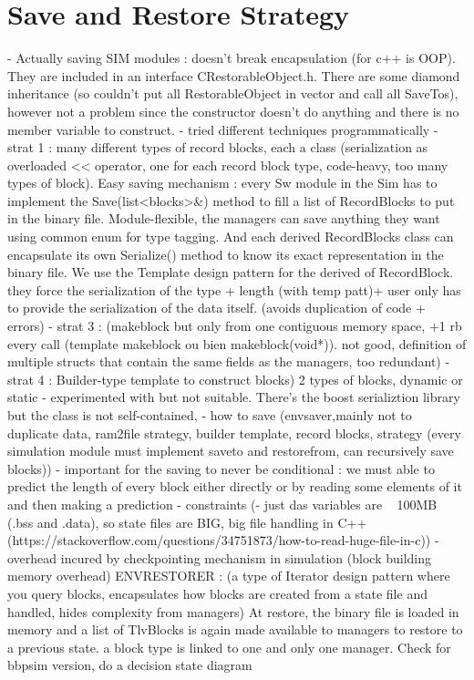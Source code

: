 {\section{Save and Restore Strategy}
- Actually saving SIM modules : doesn't break encapsulation (for c++ is OOP). They are included in an interface CRestorableObject.h. There are some diamond inheritance (so couldn't put all RestorableObject in vector and call all SaveTos), however not a problem since the constructor doesn't do anything and there is no member variable to construct.
- tried different techniques programmatically
- strat 1 : many different types of record blocks, each a class  (serialization as overloaded << operator, one for each record block type, code-heavy, too many types of block). Easy saving mechanism : every Sw module in the Sim has to implement the Save(list<blocks>\&) method to fill a list of RecordBlocks to put in the binary file. Module-flexible, the managers can save anything they want using common enum for type tagging. And each derived RecordBlocks class can encapsulate its own Serialize() method to know its exact representation in the binary file. We use the Template design pattern for the derived of RecordBlock. they force the serialization of the type + length (with temp patt)+ user only has to provide the serialization of the data itself. (avoids duplication of code + errors)
- strat 3 : (makeblock but only from one contiguous memory space, +1 rb every call (template makeblock ou bien makeblock(void*)). not good, definition of multiple structs that contain the same fields as the managers, too redundant)
- strat 4 : Builder-type template to construct blocks) 2 types of blocks, dynamic or static
- experimented with %
but not suitable. There's the boost serializtion library but the class is not self-contained, 
- how to save (envsaver,mainly not to duplicate data, ram2file strategy, builder template, record blocks, strategy (every simulation module must implement saveto and restorefrom, can recursively save blocks))
- important for the saving to never be conditional : we must able to predict the length of every block either directly or by reading some elements of it and then making a prediction
- constraints (- just das variables are ~ 100MB (.bss and .data), so state files are BIG, big file handling in C++  (https://stackoverflow.com/questions/34751873/how-to-read-huge-file-in-c))
- overhead incured by checkpointing mechanism in simulation (block building memory overhead)
ENVRESTORER : (a type of Iterator design pattern where you query blocks, encapsulates how blocks are created from a state file and handled, hides complexity from managers) At restore, the binary file is loaded in memory and a list of TlvBlocks is again made available to managers to restore to a previous state. a block type is linked to one and only one manager. Check for bbpsim version, do a decision state diagram

}
